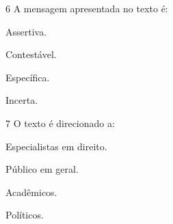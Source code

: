 \num{6} A mensagem apresentada no texto é:

\begin{escolha}
\item Assertiva.
\item Contestável.
\item Específica.
\item Incerta.
\end{escolha}



\num{7} O texto é direcionado a:

\begin{escolha}
\item Especialistas em direito.
\item Público em geral.
\item Acadêmicos.
\item Políticos.
\end{escolha}



